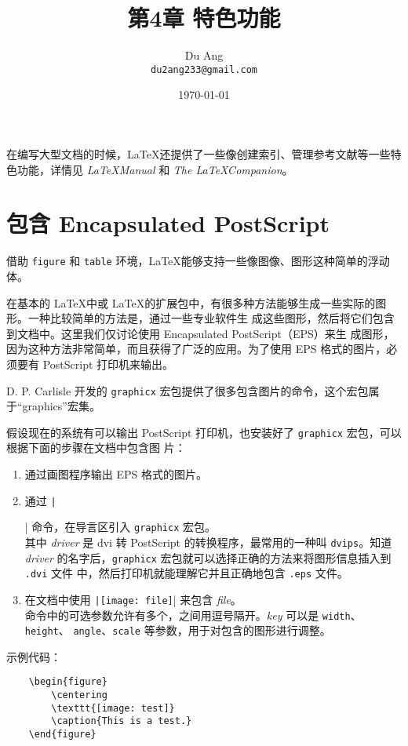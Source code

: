 \documentclass[UTF8]{ctexart}
\title{\heiti 第4章 \quad 特色功能}
\author{\kaishu Du Ang \\ \texttt{du2ang233@gmail.com} }
\date{\today}
\begin{document}
\maketitle

\tableofcontents

\newpage

在编写大型文档的时候，\LaTeX 还提供了一些像创建索引、管理参考文献等一些特色功能，详情见 \emph{\LaTeX Manual} 和
\emph{The \LaTeX Companion}。

\section{包含 Encapsulated PostScript}
借助 \texttt{figure} 和 \texttt{table} 环境，\LaTeX 能够支持一些像图像、图形这种简单的浮动体。

在基本的 \LaTeX 中或 \LaTeX 的扩展包中，有很多种方法能够生成一些实际的图形。一种比较简单的方法是，通过一些专业软件生
成这些图形，然后将它们包含到文档中。这里我们仅讨论使用 Encapsulated PostScript（EPS）来生
成图形，因为这种方法非常简单，而且获得了广泛的应用。为了使用 EPS 格式的图片，必须要有 PostScript 打印机来输出。

D. P. Carlisle 开发的 \texttt{graphicx} 宏包提供了很多包含图片的命令，这个宏包属于“graphics”宏集。

假设现在的系统有可以输出 PostScript 打印机，也安装好了 \texttt{graphicx} 宏包，可以根据下面的步骤在文档中包含图
片：
\begin{enumerate}
    \item 通过画图程序输出 EPS 格式的图片。
    \item 通过 \texttt|\usepackage[driver]{graphicx}| 命令，在导言区引入 \texttt{graphicx}
    宏包。 \\
    其中 \emph{driver} 是 dvi 转 PostScript 的转换程序，最常用的一种叫 \texttt{dvips}。知道
    \emph{driver} 的名字后，\texttt{graphicx} 宏包就可以选择正确的方法来将图形信息插入到 \texttt{.dvi} 文件
    中，然后打印机就能理解它并且正确地包含 \texttt{.eps} 文件。
    \item 在文档中使用 \texttt|\texttt{[image: file]}| 来包含 \emph{file}。
    \\ 命令中的可选参数允许有多个，之间用逗号隔开。\emph{key} 可以是 \texttt{width}、\texttt{height}、
    \texttt{angle}、\texttt{scale} 等参数，用于对包含的图形进行调整。
\end{enumerate}

示例代码：
\begin{verbatim}
    \begin{figure}
        \centering
        \texttt{[image: test]}
        \caption{This is a test.}
    \end{figure}
\end{verbatim}
\end{document}
